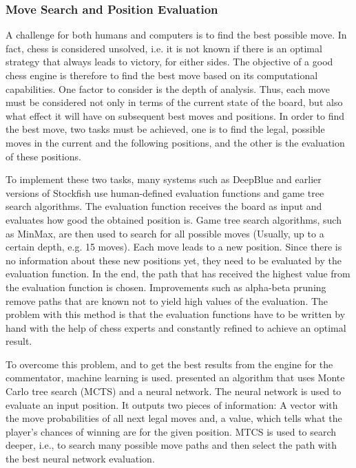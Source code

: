 \subsubsection{Move Search and Position Evaluation}

A challenge for both humans and computers is to find the best possible move. In fact, chess is considered unsolved, i.e. it is not known if there is an optimal strategy that always leads to victory, for either sides. The objective of a good chess engine is therefore to find the best move based on its computational capabilities. One factor to consider is the depth of analysis. Thus, each move must be considered not only in terms of the current state of the board, but also what effect it will have on subsequent best moves and positions. In order to find the best move, two tasks must be achieved, one is to find the legal, possible moves in the current and the following positions, and the other is the evaluation of these positions.

To implement these two tasks, many systems such as \Gls{DeepBlue} and earlier versions of \Gls{Stockfish} use human-defined evaluation functions and game tree search algorithms. The evaluation function receives the board as input and evaluates how good the obtained position is. Game tree search algorithms, such as MinMax, are then used to search for all possible moves (Usually, up to a certain depth, e.g. 15 moves). Each move leads to a new position. Since there is no information about these new positions yet, they need to be evaluated by the evaluation function. In the end, the path that has received the highest value from the evaluation function is chosen. Improvements such as alpha-beta pruning remove paths that are known not to yield high values of the evaluation. The problem with this method is that the evaluation functions have to be written by hand with the help of chess experts and constantly refined to achieve an optimal result.

To overcome this problem, and to get the best results from the engine for the commentator, machine learning is used. \cite{alphazero-2018} presented an algorithm that uses Monte Carlo tree search (MCTS) and a neural network. The neural network is used to evaluate an input position. It outputs two pieces of information: A vector with the move probabilities of all next legal moves and, a value, which tells what the player's chances of winning are for the given position. MTCS is used to search deeper, i.e., to search many possible move paths and then select the path with the best neural network evaluation.

